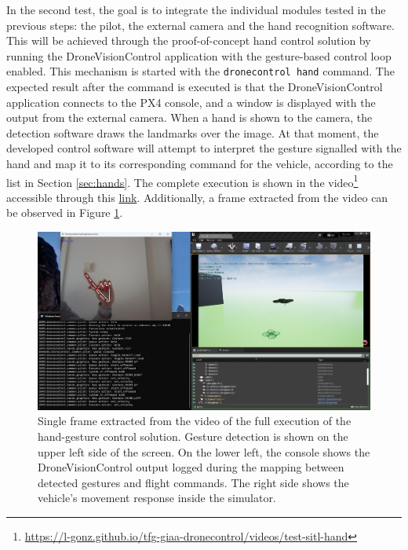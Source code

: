 In the second test, the goal is to integrate the individual modules tested in the previous steps: the pilot, the external camera and the hand recognition software. This will be achieved through the proof-of-concept hand control solution by running the DroneVisionControl application with the gesture-based control loop enabled. This mechanism is started with the \texttt{dronecontrol hand} command. The expected result after the command is executed is that the DroneVisionControl application connects to the PX4 console, and a window is displayed with the output from the external camera. When a hand is shown to the camera, the detection software draws the landmarks over the image. At that moment, the developed control software will attempt to interpret the gesture signalled with the hand and map it to its corresponding command for the vehicle, according to the list in Section \ref{sec:hands}. The complete execution is shown in the video\footnote{\url{https://l-gonz.github.io/tfg-giaa-dronecontrol/videos/test-sitl-hand}} accessible through this \href{https://l-gonz.github.io/tfg-giaa-dronecontrol/videos/test-sitl-hand}{link}. Additionally, a frame extracted from the video can be observed in Figure \ref{fig:sitl-hand-video}.

\begin{figure}[H]
  \centering
  \includegraphics[width=\textwidth, keepaspectratio]{img/video-hand-sitl.png}
  \caption{Single frame extracted from the video of the full execution of the hand-gesture control solution. Gesture detection is shown on the upper left side of the screen. On the lower left, the console shows the DroneVisionControl output logged during the mapping between detected gestures and flight commands. The right side shows the vehicle's movement response inside the simulator.}
  \label{fig:sitl-hand-video}
\end{figure}

